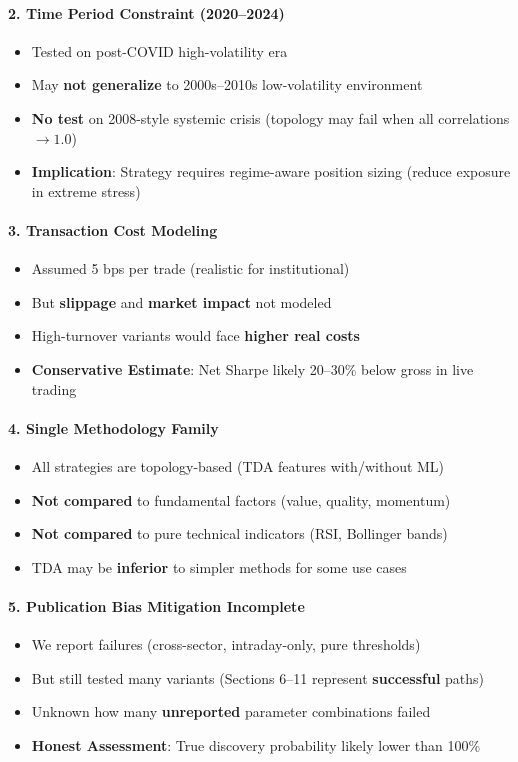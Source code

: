 \paragraph{2. Time Period Constraint (2020--2024)}
\begin{itemize}
\item Tested on post-COVID high-volatility era
\item May \textbf{not generalize} to 2000s--2010s low-volatility environment
\item \textbf{No test} on 2008-style systemic crisis (topology may fail when all correlations $\rightarrow 1.0$)
\item \textbf{Implication}: Strategy requires regime-aware position sizing (reduce exposure in extreme stress)
\end{itemize}

\paragraph{3. Transaction Cost Modeling}
\begin{itemize}
\item Assumed 5 bps per trade (realistic for institutional)
\item But \textbf{slippage} and \textbf{market impact} not modeled
\item High-turnover variants would face \textbf{higher real costs}
\item \textbf{Conservative Estimate}: Net Sharpe likely 20--30\% below gross in live trading
\end{itemize}

\paragraph{4. Single Methodology Family}
\begin{itemize}
\item All strategies are topology-based (TDA features with/without ML)
\item \textbf{Not compared} to fundamental factors (value, quality, momentum)
\item \textbf{Not compared} to pure technical indicators (RSI, Bollinger bands)
\item TDA may be \textbf{inferior} to simpler methods for some use cases
\end{itemize}

\paragraph{5. Publication Bias Mitigation Incomplete}
\begin{itemize}
\item We report failures (cross-sector, intraday-only, pure thresholds)
\item But still tested many variants (Sections 6--11 represent \textbf{successful} paths)
\item Unknown how many \textbf{unreported} parameter combinations failed
\item \textbf{Honest Assessment}: True discovery probability likely lower than 100\%
\end{itemize}


